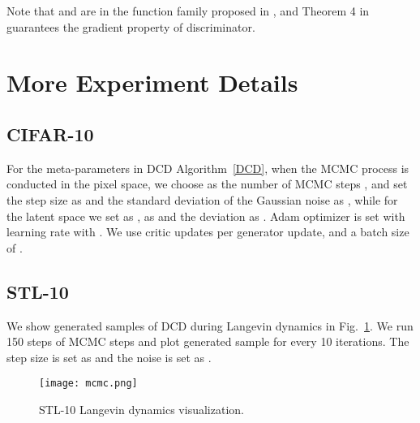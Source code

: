 \documentclass{article}
\begin{document}
Note that  and  are in the function family proposed in \cite{zhou2019lipschitz}, and Theorem 4 in \cite{zhou2019lipschitz} guarantees the gradient property of discriminator. 



\section{More Experiment Details}
\label{app:sec:mcmc-stl}

\subsection{CIFAR-10}
For the meta-parameters in DCD Algorithm~\ref{DCD}, when the MCMC process is conducted in the pixel space, we choose  as the number of MCMC steps , and set the step size  as  and the standard deviation of the Gaussian noise as , while for the latent space we set  as ,  as  and the deviation as . Adam optimizer \cite{kingma2014adam} is set with  learning rate with . We use  critic updates per generator update, and a batch size of .

\subsection{STL-10}
We show generated samples of DCD during Langevin dynamics in Fig.~\ref{app:fig:stl}. We run 150 steps of MCMC steps
and plot generated sample for every 10 iterations. The step size is set as  and the noise is set as .

\begin{figure}[!h]
    \centering
    \texttt{[image: mcmc.png]}
    \caption{STL-10 Langevin dynamics visualization.}
    \label{app:fig:stl}
\end{figure}
 
\end{document}
